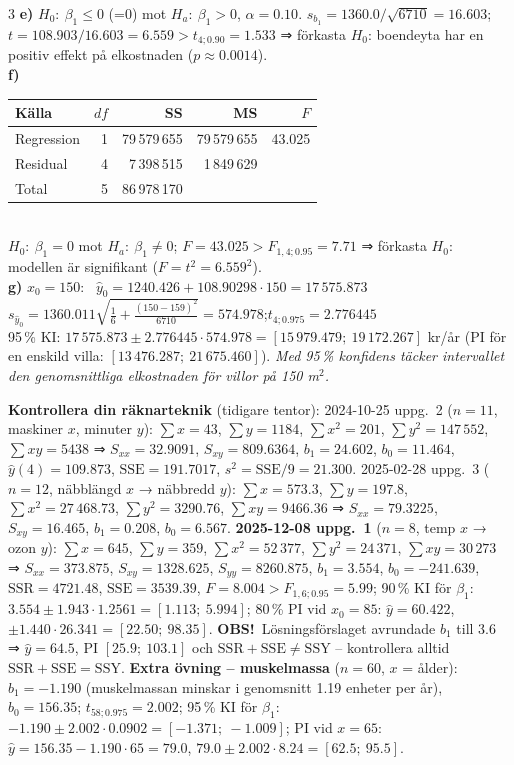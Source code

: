 \documentclass[8pt]{extarticle}
\newcommand{\obs}{{\color{BrickRed}\sffamily\bfseries OBS!}\ }
\newcommand{\SSE}{\mathrm{SSE}}
\newcommand{\SSR}{\mathrm{SSR}}
\newcommand{\SSY}{\mathrm{SSY}}
\begin{document}
\begin{multicols*}{3}
\textbf{e)} $H_0{:}\ \beta_1\le0$ (=0) mot $H_a{:}\ \beta_1>0$, $\alpha=0.10$. $s_{b_1}=1360.0/\sqrt{6710}=16.603$; $t=108.903/16.603=6.559>t_{4;0.90}=1.533$ ⇒ förkasta $H_0$: boendeyta har en positiv effekt på elkostnaden ($p\approx0.0014$).\\
\textbf{f)} {\footnotesize
\begin{tabular}[t]{@{}lrrrr@{}}
Källa & $df$ & SS & MS & $F$\\\hline
Regression & 1 & 79\,579\,655 & 79\,579\,655 & 43.025\\
Residual & 4 & 7\,398\,515 & 1\,849\,629 & \\
Total & 5 & 86\,978\,170 & &
\end{tabular}}\\[1pt]
$H_0{:}\ \beta_1=0$ mot $H_a{:}\ \beta_1\neq0$; $F=43.025>F_{1,4;0.95}=7.71$ ⇒ förkasta $H_0$: modellen är signifikant ($F=t^2=6.559^2$).\\
\textbf{g)} $x_0=150$: \ $\hat y_0=1240.426+108.90298\cdot150=17\,575.873$\\
$s_{\hat y_0}=1360.011\sqrt{\tfrac16+\tfrac{(150-159)^2}{6710}}=574.978$;\quad $t_{4;0.975}=2.776445$\\
95\,\% KI: $17\,575.873\pm2.776445\cdot574.978=[15\,979.479;\ 19\,172.267]$ kr/år (PI för en enskild villa: $[13\,476.287;\ 21\,675.460]$). \emph{Med 95\,\% konfidens täcker intervallet den genomsnittliga elkostnaden för villor på 150 m$^2$.}\par
{\small\textbf{Kontrollera din räknarteknik} (tidigare tentor): 2024-10-25 uppg.\ 2 ($n=11$, maskiner $x$, minuter $y$): $\sum x=43$, $\sum y=1184$, $\sum x^2=201$, $\sum y^2=147\,552$, $\sum xy=5438$ ⇒ $S_{xx}=32.9091$, $S_{xy}=809.6364$, $b_1=24.602$, $b_0=11.464$, $\hat y(4)=109.873$, $\SSE=191.7017$, $s^2=\SSE/9=21.300$. 2025-02-28 uppg.\ 3 ($n=12$, näbblängd $x$ → näbbredd $y$): $\sum x=573.3$, $\sum y=197.8$, $\sum x^2=27\,468.73$, $\sum y^2=3290.76$, $\sum xy=9466.36$ ⇒ $S_{xx}=79.3225$, $S_{xy}=16.465$, $b_1=0.208$, $b_0=6.567$. \textbf{2025-12-08 uppg.\ 1} ($n=8$, temp $x$ → ozon $y$): $\sum x=645$, $\sum y=359$, $\sum x^2=52\,377$, $\sum y^2=24\,371$, $\sum xy=30\,273$ ⇒ $S_{xx}=373.875$, $S_{xy}=1328.625$, $S_{yy}=8260.875$, $b_1=3.554$, $b_0=-241.639$, $\SSR=4721.48$, $\SSE=3539.39$, $F=8.004>F_{1,6;0.95}=5.99$; 90\,\% KI för $\beta_1$: $3.554\pm1.943\cdot1.2561=[1.113;\ 5.994]$; 80\,\% PI vid $x_0=85$: $\hat y=60.422$, $\pm1.440\cdot26.341=[22.50;\ 98.35]$. \obs Lösningsförslaget avrundade $b_1$ till 3.6 ⇒ $\hat y=64.5$, PI $[25.9;\ 103.1]$ och $\SSR+\SSE\neq\SSY$ – kontrollera alltid $\SSR+\SSE=\SSY$. \textbf{Extra övning – muskelmassa} ($n=60$, $x$ = ålder): $b_1=-1.190$ (muskelmassan minskar i genomsnitt 1.19 enheter per år), $b_0=156.35$; $t_{58;0.975}=2.002$; 95\,\% KI för $\beta_1$: $-1.190\pm2.002\cdot0.0902=[-1.371;\ -1.009]$; PI vid $x=65$: $\hat y=156.35-1.190\cdot65=79.0$, $79.0\pm2.002\cdot8.24=[62.5;\ 95.5]$.\par}


\end{multicols*}
\end{document}
